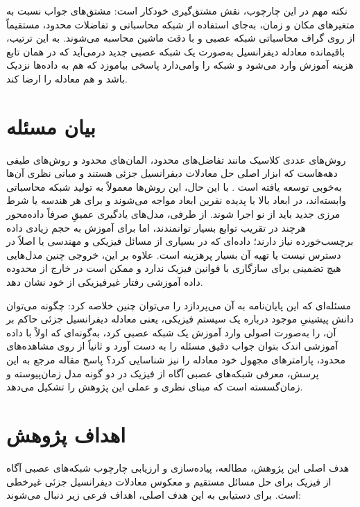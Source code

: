 نکته مهم در این چارچوب، نقش مشتق‌گیری خودکار است:
مشتق‌های جواب نسبت به متغیرهای مکان و زمان، به‌جای استفاده از شبکه محاسباتی
و تفاضلات محدود، مستقیماً از روی گراف محاسباتی شبکه عصبی و با دقت ماشین
محاسبه می‌شوند. به این ترتیب، باقیمانده معادله دیفرانسیل به‌صورت یک شبکه
عصبی جدید درمی‌آید که در همان تابع هزینه آموزش وارد می‌شود و شبکه را وامی‌دارد
پاسخی بیاموزد که هم به داده‌ها نزدیک باشد و هم معادله را ارضا کند.

\section{بیان مسئله}
\label{sec:problem}

روش‌های عددی کلاسیک مانند تفاضل‌های محدود،
المان‌های محدود و روش‌های طیفی
دهه‌هاست که ابزار اصلی حل معادلات دیفرانسیل جزئی هستند و مبانی نظری آن‌ها
به‌خوبی توسعه یافته است \cite{leveque2007}. با این حال، این روش‌ها معمولاً به
تولید شبکه محاسباتی وابسته‌اند، در ابعاد بالا با پدیده نفرین ابعاد
مواجه می‌شوند و برای هر هندسه یا شرط مرزی جدید باید از نو اجرا شوند. از طرفی،
مدل‌های یادگیری عمیقِ صرفاً داده‌محور هرچند در تقریب توابع بسیار توانمندند،
اما برای آموزش به حجم زیادی داده برچسب‌خورده نیاز دارند؛ داده‌ای که در
بسیاری از مسائل فیزیکی و مهندسی یا اصلاً در دسترس نیست یا تهیه آن بسیار
پرهزینه است. علاوه بر این، خروجی چنین مدل‌هایی هیچ تضمینی برای سازگاری با
قوانین فیزیک ندارد و ممکن است در خارج از محدوده داده آموزشی رفتار غیرفیزیکی
از خود نشان دهد.

مسئله‌ای که این پایان‌نامه به آن می‌پردازد را می‌توان چنین خلاصه کرد: چگونه
می‌توان دانش پیشینیِ موجود درباره یک سیستم فیزیکی، یعنی معادله دیفرانسیل
جزئی حاکم بر آن، را به‌صورت اصولی وارد آموزش یک شبکه عصبی کرد، به‌گونه‌ای که
اولاً با داده آموزشی اندک بتوان جواب دقیق مسئله را به دست آورد و ثانیاً از
روی مشاهده‌های محدود، پارامترهای مجهول خود معادله را نیز شناسایی کرد؟ پاسخ
مقاله مرجع به این پرسش، معرفی شبکه‌های عصبی آگاه از فیزیک در دو گونه مدل
زمان‌پیوسته و زمان‌گسسته است \cite{raissi2019} که مبنای نظری و عملی این
پژوهش را تشکیل می‌دهد.

\section{اهداف پژوهش}
\label{sec:goals}

هدف اصلی این پژوهش، مطالعه، پیاده‌سازی و ارزیابی چارچوب شبکه‌های عصبی آگاه
از فیزیک برای حل مسائل مستقیم و معکوس معادلات دیفرانسیل جزئی غیرخطی است.
برای دستیابی به این هدف اصلی، اهداف فرعی زیر دنبال می‌شوند:

